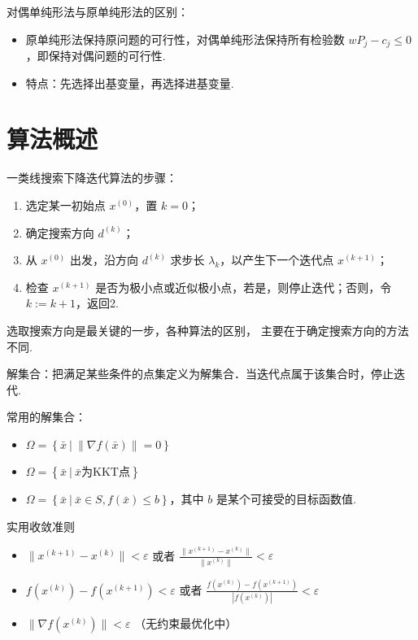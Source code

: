 \begin{remark}
    对偶单纯形法与原单纯形法的区别：
    \begin{itemize}
        \item 原单纯形法保持原问题的可行性，对偶单纯形法保持所有检验数 $wP_j - c_j \le 0$，即保持对偶问题的可行性.
        \item 特点：先选择出基变量，再选择进基变量.
    \end{itemize}
\end{remark}


\section{算法概述}
\begin{remark}
    一类线搜索下降迭代算法的步骤：
    \begin{enumerate}
        \item 选定某一初始点 $x^{(0)}$，置 $k = 0$；
        \item 确定搜索方向 $d^{(k)}$；
        \item 从 $x^{(0)}$ 出发，沿方向 $d^{(k)}$ 求步长 $\lambda_k$，以产生下一个迭代点 $x^{(k + 1)}$；
        \item 检查 $x^{(k + 1)}$ 是否为极小点或近似极小点，若是，则停止迭代；否则，令 $k:= k + 1$，返回2.
    \end{enumerate}

    选取搜索方向是最关键的一步，各种算法的区别， 主要在于确定搜索方向的方法不同.
\end{remark}

\begin{remark}
    解集合：把满足某些条件的点集定义为解集合．当迭代点属于该集合时，停止迭代.
    
    常用的解集合：
    \begin{itemize}
        \item $\Omega = \left\{\bar{x}\ |\ \|\nabla f(\bar{x})\| = 0\right\}$
        \item $\Omega = \left\{\bar{x}\ |\ \bar{x} \text{为KKT点}\right\}$
        \item $\Omega = \left\{\bar{x}\ |\ \bar{x} \in S, f(\bar{x}) \le b\right\}$，其中 $b$ 是某个可接受的目标函数值.
    \end{itemize}
\end{remark}

\begin{remark}
    实用收敛准则
    \begin{itemize}
        \item $\|x^{(k + 1)} - x^{(k)}\| < \varepsilon$ 或者 $\frac{\|x^{(k + 1)} - x^{(k)}\|}{\|x^{(k)}\|} < \varepsilon$
        \item $f(x^{(k)}) - f(x^{(k + 1)}) < \varepsilon$ 或者 $\frac{f(x^{(k)}) - f(x^{(k + 1)})}{|f(x^{(k)})|} < \varepsilon$
        \item $\|\nabla f(x^{(k)})\| < \varepsilon$ （无约束最优化中）
    \end{itemize}
\end{remark}

